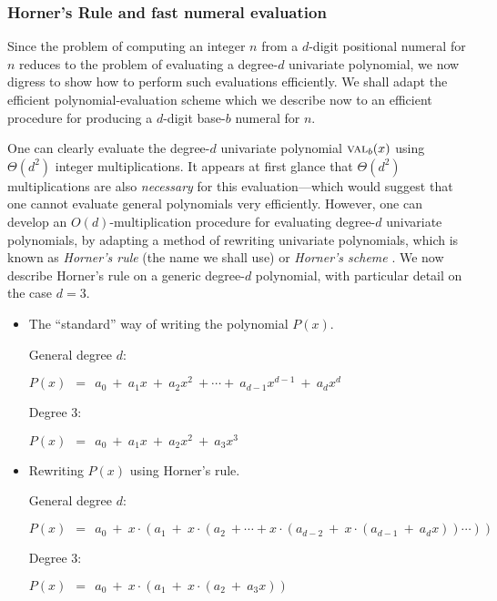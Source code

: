 \subsubsection{Horner's Rule and fast numeral evaluation}

Since the problem of computing an integer $n$ from a $d$-digit positional numeral for $n$ reduces to the problem of evaluating a degree-$d$ univariate polynomial, we now digress to show how to perform such evaluations efficiently.  We shall adapt the efficient polynomial-evaluation scheme which we describe now to an efficient procedure for producing a $d$-digit base-$b$ numeral for $n$.

\medskip

 
 

One can clearly evaluate the degree-$d$ univariate polynomial $\mbox{\sc val}_{b}(x)$ using $\Theta(d^2)$ integer multiplications.  It appears at first glance that $\Theta(d^2)$ multiplications are also {\em necessary} for this evaluation---which would suggest that one cannot evaluate general polynomials very efficiently.  However, one can develop an $O(d)$-multiplication procedure for evaluating degree-$d$ univariate polynomials, by adapting a method of rewriting univariate polynomials, which is known as {\it Horner's rule} (the name we shall use) or {\it Horner's scheme} \cite{Horner}.  We now describe Horner's rule on a generic degree-$d$ polynomial, with particular detail on the case $d=3$.

\bigskip

\noindent {}

\bigskip

\begin{itemize}
\item {\small\sf The ``standard'' way of writing the polynomial $P(x)$.}

\noindent General degree $d$:

$P(x) \ \ = \ \ a_0 \ + \ a_1 x \ + \ a_2 x^2 \ + \cdots + \ a_{d-1} x^{d-1} \ + \ a_d x^d$

\noindent Degree $3$:

$P(x) \ \ = \ \ a_0 \ + \ a_1 x \ + \ a_2 x^2 \ + \ a_3 x^3$

\item {\small\sf Rewriting $P(x)$ using Horner's rule.}

\noindent General degree $d$:

$P(x) \ \ = \ \ a_0 \ + \ x \cdot (a_1 \ + \ x \cdot (a_2  \ +  \cdots
+ x \cdot (a_{d-2} \ + \ x \cdot (a_{d-1} \ + \ a_d x)) \cdots ))$  

\noindent Degree $3$:

$P(x) \ \ = \ \ a_0 \ + \ x \cdot (a_1 \ + \ x \cdot (a_2  \ + \ a_3 x))$ 
\end{itemize}

